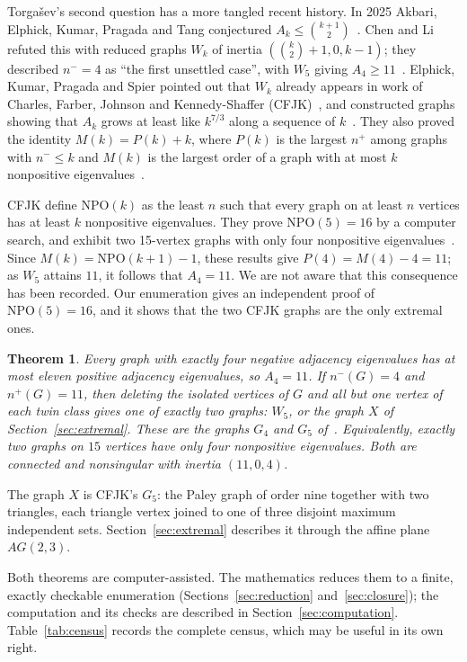 \documentclass[11pt]{amsart}
\newtheorem{theorem}{Theorem}[section]
\theoremstyle{definition}
\theoremstyle{remark}
\begin{document}
Torga\v{s}ev's second question has a more tangled recent history. In 2025 Akbari, Elphick, Kumar, Pragada and Tang conjectured $A_k\le\binom{k+1}{2}$~\cite{AEKPT2026}. Chen and Li refuted this with reduced graphs $W_k$ of inertia $(\binom{k}{2}+1,0,k-1)$; they described $n^-=4$ as ``the first unsettled case'', with $W_5$ giving $A_4\ge 11$~\cite{ChenLi2026}. Elphick, Kumar, Pragada and Spier pointed out that $W_k$ already appears in work of Charles, Farber, Johnson and Kennedy-Shaffer (CFJK)~\cite{CFJK2013}, and constructed graphs showing that $A_k$ grows at least like $k^{7/3}$ along a sequence of $k$~\cite{EKPS2026}. They also proved the identity $M(k)=P(k)+k$, where $P(k)$ is the largest $n^+$ among graphs with $n^-\le k$ and $M(k)$ is the largest order of a graph with at most $k$ nonpositive eigenvalues~\cite[\S2]{EKPS2026}.

CFJK define $\mathrm{NPO}(k)$ as the least $n$ such that every graph on at least $n$ vertices has at least $k$ nonpositive eigenvalues. They prove $\mathrm{NPO}(5)=16$ by a computer search, and exhibit two 15-vertex graphs with only four nonpositive eigenvalues~\cite[Lemma~4.6 and Theorem~4.7]{CFJK2013}. Since $M(k)=\mathrm{NPO}(k+1)-1$, these results give $P(4)=M(4)-4=11$; as $W_5$ attains $11$, it follows that $A_4=11$. We are not aware that this consequence has been recorded. Our enumeration gives an independent proof of $\mathrm{NPO}(5)=16$, and it shows that the two CFJK graphs are the only extremal ones.

\begin{theorem}\label{thm:main}
Every graph with exactly four negative adjacency eigenvalues has at most eleven positive adjacency eigenvalues, so $A_4=11$. If $n^-(G)=4$ and $n^+(G)=11$, then deleting the isolated vertices of $G$ and all but one vertex of each twin class gives one of exactly two graphs: $W_5$, or the graph $X$ of Section~\ref{sec:extremal}. These are the graphs $G_4$ and $G_5$ of~\cite{CFJK2013}. Equivalently, exactly two graphs on $15$ vertices have only four nonpositive eigenvalues. Both are connected and nonsingular with inertia $(11,0,4)$.
\end{theorem}

The graph $X$ is CFJK's $G_5$: the Paley graph of order nine together with two triangles, each triangle vertex joined to one of three disjoint maximum independent sets. Section~\ref{sec:extremal} describes it through the affine plane $AG(2,3)$.

Both theorems are computer-assisted. The mathematics reduces them to a finite, exactly checkable enumeration (Sections~\ref{sec:reduction} and~\ref{sec:closure}); the computation and its checks are described in Section~\ref{sec:computation}. Table~\ref{tab:census} records the complete census, which may be useful in its own right.
\end{document}
